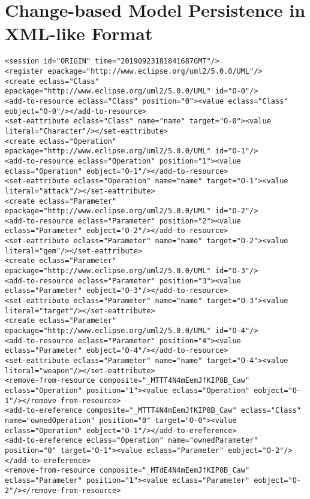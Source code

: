 \chapter{Change-based Model Persistence in XML-like Format}
\label{sec:examples_of_cbp}

\begin{lstlisting}[style=cbpfile,caption={Change-based representation of the model in Figure \ref{fig:class_diagram_left}.},label=lst:class_diagram_left_cbpfile]
<session id="ORIGIN" time="20190923181841687GMT"/>
<register epackage="http://www.eclipse.org/uml2/5.0.0/UML"/>
<create eclass="Class" epackage="http://www.eclipse.org/uml2/5.0.0/UML" id="O-0"/>
<add-to-resource eclass="Class" position="0"><value eclass="Class" eobject="O-0"/></add-to-resource>
<set-eattribute eclass="Class" name="name" target="O-0"><value literal="Character"/></set-eattribute>
<create eclass="Operation" epackage="http://www.eclipse.org/uml2/5.0.0/UML" id="O-1"/>
<add-to-resource eclass="Operation" position="1"><value eclass="Operation" eobject="O-1"/></add-to-resource>
<set-eattribute eclass="Operation" name="name" target="O-1"><value literal="attack"/></set-eattribute>
<create eclass="Parameter" epackage="http://www.eclipse.org/uml2/5.0.0/UML" id="O-2"/>
<add-to-resource eclass="Parameter" position="2"><value eclass="Parameter" eobject="O-2"/></add-to-resource>
<set-eattribute eclass="Parameter" name="name" target="O-2"><value literal="gem"/></set-eattribute>
<create eclass="Parameter" epackage="http://www.eclipse.org/uml2/5.0.0/UML" id="O-3"/>
<add-to-resource eclass="Parameter" position="3"><value eclass="Parameter" eobject="O-3"/></add-to-resource>
<set-eattribute eclass="Parameter" name="name" target="O-3"><value literal="target"/></set-eattribute>
<create eclass="Parameter" epackage="http://www.eclipse.org/uml2/5.0.0/UML" id="O-4"/>
<add-to-resource eclass="Parameter" position="4"><value eclass="Parameter" eobject="O-4"/></add-to-resource>
<set-eattribute eclass="Parameter" name="name" target="O-4"><value literal="weapon"/></set-eattribute>
<remove-from-resource composite="_MTTT4N4mEemJfKIP8B_Caw" eclass="Operation" position="1"><value eclass="Operation" eobject="O-1"/></remove-from-resource>
<add-to-ereference composite="_MTTT4N4mEemJfKIP8B_Caw" eclass="Class" name="ownedOperation" position="0" target="O-0"><value eclass="Operation" eobject="O-1"/></add-to-ereference>
<add-to-ereference eclass="Operation" name="ownedParameter" position="0" target="O-1"><value eclass="Parameter" eobject="O-2"/></add-to-ereference>
<remove-from-resource composite="_MTdE4N4mEemJfKIP8B_Caw" eclass="Parameter" position="1"><value eclass="Parameter" eobject="O-2"/></remove-from-resource>

\end{lstlisting}
